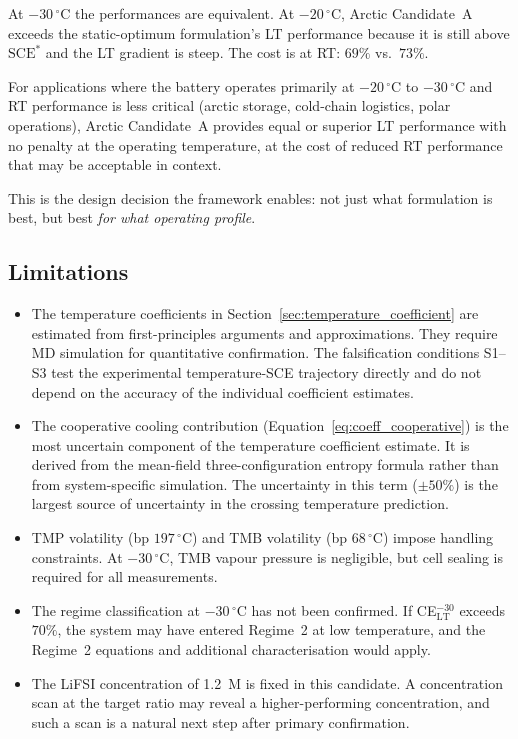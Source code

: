 \documentclass[11pt]{article}
\theoremstyle{plain}
\theoremstyle{definition}
\theoremstyle{remark}
\begin{document}
At $-30\,^\circ$C the performances are equivalent.  At $-20\,^\circ$C,
Arctic Candidate~A exceeds the static-optimum formulation's LT
performance because it is still above $\mathrm{SCE}^{*}$ and the
LT gradient is steep.  The cost is at RT: $69\%$ vs.\ $73\%$.

For applications where the battery operates primarily at
$-20\,^\circ$C to $-30\,^\circ$C and RT performance is less
critical (arctic storage, cold-chain logistics, polar operations),
Arctic Candidate~A provides equal or superior LT performance with
no penalty at the operating temperature, at the cost of reduced
RT performance that may be acceptable in context.

This is the design decision the framework enables: not just what
formulation is best, but best \emph{for what operating profile}.

\subsection{Limitations}

\begin{itemize}[leftmargin=2em]
  \item The temperature coefficients in Section~\ref{sec:temperature_coefficient}
        are estimated from first-principles arguments and approximations.
        They require MD simulation for quantitative confirmation.
        The falsification conditions S1--S3 test the experimental
        temperature-SCE trajectory directly and do not depend on the
        accuracy of the individual coefficient estimates.
  \item The cooperative cooling contribution
        (Equation~\ref{eq:coeff_cooperative}) is the most uncertain
        component of the temperature coefficient estimate.  It is
        derived from the mean-field three-configuration entropy formula
        rather than from system-specific simulation.  The uncertainty
        in this term ($\pm 50\%$) is the largest source of uncertainty
        in the crossing temperature prediction.
  \item TMP volatility (bp $197\,^\circ$C) and TMB volatility
        (bp $68\,^\circ$C) impose handling constraints.  At
        $-30\,^\circ$C, TMB vapour pressure is negligible, but
        cell sealing is required for all measurements.
  \item The regime classification at $-30\,^\circ$C has not been
        confirmed.  If CE$_\mathrm{LT}^{-30}$ exceeds $70\%$,
        the system may have entered Regime~2 at low temperature,
        and the Regime~2 equations and additional characterisation
        would apply.
  \item The LiFSI concentration of 1.2~M is fixed in this
        candidate.  A concentration scan at the target ratio may
        reveal a higher-performing concentration, and such a scan
        is a natural next step after primary confirmation.
\end{itemize}
\end{document}
